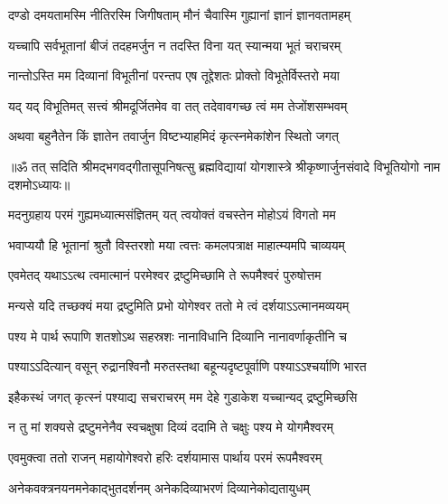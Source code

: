 \twolineshloka
{दण्डो दमयतामस्मि नीतिरस्मि जिगीषताम्}
{मौनं चैवास्मि गुह्यानां ज्ञानं ज्ञानवतामहम्}%

\twolineshloka
{यच्चापि सर्वभूतानां बीजं तदहमर्जुन}
{न तदस्ति विना यत् स्यान्मया भूतं चराचरम्}%

\twolineshloka
{नान्तोऽस्ति मम दिव्यानां विभूतीनां परन्तप}
{एष तूद्देशतः प्रोक्तो विभूतेर्विस्तरो मया}%

\twolineshloka
{यद् यद् विभूतिमत् सत्त्वं श्रीमदूर्जितमेव वा}
{तत् तदेवावगच्छ त्वं मम तेजोंशसम्भवम्}%

\twolineshloka
{अथवा बहुनैतेन किं ज्ञातेन तवार्जुन}
{विष्टभ्याहमिदं कृत्स्नमेकांशेन स्थितो जगत्}%

{॥ॐ तत् सदिति श्रीमद्भगवद्गीतासूपनिषत्सु ब्रह्मविद्यायां योगशास्त्रे श्रीकृष्णार्जुनसंवादे विभूतियोगो नाम दशमोऽध्यायः॥}



\twolineshloka
{मदनुग्रहाय परमं गुह्यमध्यात्मसंज्ञितम्}
{यत् त्वयोक्तं वचस्तेन मोहोऽयं विगतो मम}%

\twolineshloka
{भवाप्ययौ हि भूतानां श्रुतौ विस्तरशो मया}
{त्वत्तः कमलपत्राक्ष माहात्म्यमपि चाव्ययम्}%

\twolineshloka
{एवमेतद् यथाऽऽत्थ त्वमात्मानं परमेश्वर}
{द्रष्टुमिच्छामि ते रूपमैश्वरं पुरुषोत्तम}%

\twolineshloka
{मन्यसे यदि तच्छक्यं मया द्रष्टुमिति प्रभो}
{योगेश्वर ततो मे त्वं दर्शयाऽऽत्मानमव्ययम्}%


\twolineshloka
{पश्य मे पार्थ रूपाणि शतशोऽथ सहस्रशः}
{नानाविधानि दिव्यानि नानावर्णाकृतीनि च}%

\twolineshloka
{पश्याऽऽदित्यान् वसून् रुद्रानश्विनौ मरुतस्तथा}
{बहून्यदृष्टपूर्वाणि पश्याऽऽश्चर्याणि भारत}%

\twolineshloka
{इहैकस्थं जगत् कृत्स्नं पश्याद्य सचराचरम्}
{मम देहे गुडाकेश यच्चान्यद् द्रष्टुमिच्छसि}%

\twolineshloka
{न तु मां शक्यसे द्रष्टुमनेनैव स्वचक्षुषा}
{दिव्यं ददामि ते चक्षुः पश्य मे योगमैश्वरम्}%


\twolineshloka
{एवमुक्त्वा ततो राजन् महायोगेश्वरो हरिः}
{दर्शयामास पार्थाय परमं रूपमैश्वरम्}%

\twolineshloka
{अनेकवक्त्रनयनमनेकाद्भुतदर्शनम्}
{अनेकदिव्याभरणं दिव्यानेकोद्यतायुधम्}%

